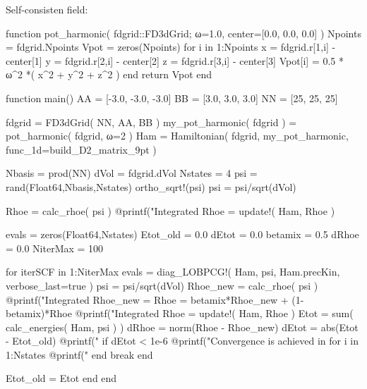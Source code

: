 Self-consisten field:
\begin{juliacode}
function pot_harmonic( fdgrid::FD3dGrid; ω=1.0, center=[0.0, 0.0, 0.0] )
    Npoints = fdgrid.Npoints
    Vpot = zeros(Npoints)
    for i in 1:Npoints
        x = fdgrid.r[1,i] - center[1]
        y = fdgrid.r[2,i] - center[2]
        z = fdgrid.r[3,i] - center[3]
        Vpot[i] = 0.5 * ω^2 *( x^2 + y^2 + z^2 )
    end
    return Vpot
end

function main()
    AA = [-3.0, -3.0, -3.0]
    BB = [3.0, 3.0, 3.0]
    NN = [25, 25, 25]

    fdgrid = FD3dGrid( NN, AA, BB )
    my_pot_harmonic( fdgrid ) = pot_harmonic( fdgrid, ω=2 )
    Ham = Hamiltonian( fdgrid, my_pot_harmonic, func_1d=build_D2_matrix_9pt )

    Nbasis = prod(NN)
    dVol = fdgrid.dVol
    Nstates = 4
    psi = rand(Float64,Nbasis,Nstates)
    ortho_sqrt!(psi)
    psi = psi/sqrt(dVol)

    Rhoe = calc_rhoe( psi )
    @printf("Integrated Rhoe = %
    update!( Ham, Rhoe )

    evals = zeros(Float64,Nstates)
    Etot_old = 0.0
    dEtot = 0.0
    betamix = 0.5
    dRhoe = 0.0
    NiterMax = 100

    for iterSCF in 1:NiterMax
        evals = diag_LOBPCG!( Ham, psi, Ham.precKin, verbose_last=true )
        psi = psi/sqrt(dVol)
        Rhoe_new = calc_rhoe( psi )
        @printf("Integrated Rhoe_new = %
        Rhoe = betamix*Rhoe_new + (1-betamix)*Rhoe
        @printf("Integrated Rhoe     = %
        update!( Ham, Rhoe )
        Etot = sum( calc_energies( Ham, psi ) )
        dRhoe = norm(Rhoe - Rhoe_new)
        dEtot = abs(Etot - Etot_old)
        @printf("%
        if dEtot < 1e-6
            @printf("Convergence is achieved in %
            for i in 1:Nstates
                @printf("%
            end
            break
        end

        Etot_old = Etot
    end
end
\end{juliacode}